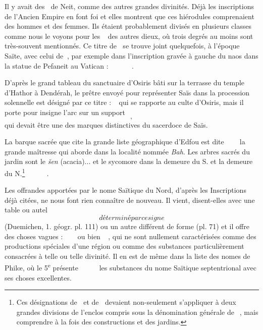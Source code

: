 \documentclass[letterpaper,twocolumn,openany,nodeprecatedcode]{dndbook}
\newcommand*\hieroAAAH{}
\newcommand*\hieroAAAO{}
\newcommand*\hieroAAAQ{}
\newcommand*\hieroAAAX{}
\newcommand*\hieroAABM{}
\newcommand*\hieroAABY{\raisebox{0.5ex}{}}
\newcommand*\hieroAADL{}
\newcommand*\hieroAADT{}
\newcommand*\hieroAADV{\raisebox{0.5ex}{}}
\newcommand*\hieroAAEB{}
\newcommand*\hieroAAEF{}
\newcommand*\hieroAAEK{}
\newcommand*\hieroAAEZ{}
\newcommand*\hieroAAFB{}
\newcommand*\hieroAAFH{}
\newcommand*\hieroAAFK{\raisebox{0.3ex}{}}
\newcommand*\hieroAAFL{}
\newcommand*\hieroAAFM{}
\newcommand*\hieroAAFN{\raisebox{0.5ex}{}}
\newcommand*\hieroAAFQ{}
\newcommand*\hieroAAFS{}
\newcommand*\hieroAAHA{}
\newcommand*\hieroAAHC{}
\newcommand*\hieroAAIK{}
\newcommand*\hieroAAJN{}
\newcommand*\hieroAAMP{}
\newcommand*\hieroAANA{}
\newcommand*\hieroAANP{}
\newcommand*\hieroAAOR{}
\newcommand*\hieroAAQJ{}
\newcommand*\hieroAAQK{}
\newcommand*\hieroAAQL{}
\newcommand*\hieroAAQM{}
\newcommand*\hieroAAQN{}
\newcommand*\hieroAAQO{}
\newcommand*\hieroAAQP{}
\newcommand*\hieroAAQQ{}
\newcommand*\hieroAAQR{}
\newcommand*\hieroAAQS{}
\newcommand*\hieroAAQT{}
\newcommand*\hieroAAQU{}
\newcommand*\hieroAAQV{}
\newcommand*\hieroAAQW{}
\newcommand*\hieroAAQX{}
\newcommand*\hieroAAQY{}
\newcommand*\hieroAAQZ{}
\newcommand*\hieroAARA{}
\newcommand*\hieroAARB{}
\newcommand*\hieroAARC{\raisebox{0.5ex}{}}
\newcommand*\hieroAARD{}
\newcommand*\hieroAARE{}
\newcommand*\hieroAARF{}
\newcommand*\hieroAARG{}
\newcommand*\hieroAARH{}
\newcommand*\hieroAARI{}
\newcommand*\hieroAARJ{}
\newcommand*\hieroAARK{\raisebox{0.5ex}{}}
\newcommand*\hieroAARL{}
\begin{document}
Il y avait des $\hieroAAEK\:\hieroAAHC$ de Neit, comme des autres grandes divinités. Déjà les inscriptions de l'Ancien Empire en font foi et elles montrent que ces hiérodules comprenaient des hommes et des femmes. Ils étaient probablement divisés en plusieurs classes comme nous le voyons pour les $\hieroAAEK\:\hieroAAHC\:\hieroAAEF$ des autres dieux, où trois degrés au moins sont très-souvent mentionnés. Ce titre de $\hieroAAEK\:\hieroAAHC$ se trouve joint quelquefois, à l'époque Saïte, avec celui de $\hieroAAOR\:\hieroAAHA$, par exemple dans l'inscription gravée à gauche du naos dans la statue de Pefaneit au Vatican : $\hieroAAOR\:\hieroAAHA\:\hieroAAEK\allowbreak\:\hieroAAHC\:\hieroAAAQ\:\hieroAAAO\allowbreak\:\hieroAAAH\:\hieroAANA
\:\hieroAADL\:\hieroAAFN\allowbreak\:\hieroAAQJ\:\hieroAAFK\allowbreak\:\hieroAAAQ\:\hieroAAAO$.

D'après le grand tableau du sanctuaire d'Osiris bâti sur la terrasse du temple d'Hathor à Dendérah, le prêtre envoyé pour représenter Saïs dans la procession solennelle est désigné par ce titre : $\hieroAAJN\:\hieroAAQK\:\hieroAAEB$ qui se rapporte au culte d'Osiris, mais il porte pour insigne l'arc sur un support $\hieroAAQL$, $\hieroAAQM$ qui devait être une des marques distinctives du sacerdoce de Saïs.

La barque sacrée que cite la grande liste géographique d'Edfou est dite $\hieroAAFS\:\hieroAAFQ\:\hieroAAQN\allowbreak\:\hieroAAFH\:\hieroAABM\:\hieroAANP\allowbreak\:\hieroAAFL\:\hieroAAFM$ la grande maîtresse qui aborde dans la localité nommée \emph{Bah}. Les arbres sacrés du jardin sont le \emph{šen} (acacia)... et le sycomore dans la demeure du S. et la demeure du N.\footnote{Ces désignations de $\hieroAAQS\:\hieroAAQT$ et de $\hieroAAQU\:\hieroAAQT$ devaient non-seulement s'appliquer à deux grandes divisions de l'enclos compris sous la dénomination générale de $\hieroAAHA\:\hieroAAAQ\:\hieroAAAO$, mais comprendre à la fois des constructions et des jardins.} $\hieroAAQO\:\hieroAAQP\:\hieroAAQQ\allowbreak\:\hieroAAAH\:\hieroAAEK\:\hieroAAQP\allowbreak\:\hieroAAQR\:\hieroAAQP\:\hieroAADV\allowbreak\:\hieroAAQS\:\hieroAAQT\allowbreak\:\hieroAAQU\:\hieroAAQV$.

Les offrandes apportées par le nome Saïtique du Nord, d'après les Inscriptions déjà citées, ne nous font rien connaître de nouveau. Il vient, disent-elles avec une table ou autel $\hieroAAQW$ déterminé par ce signe $\hieroAAQX$ (Duemichen, 1. géogr. pl. 111) ou un autre différent de forme (pl. 71) et il offre des choses vagues : $\hieroAAQY\:\hieroAAQZ\:\hieroAAMP\allowbreak\:\hieroAADV\:\hieroAAAX\allowbreak\:\hieroAAIK\:\hieroAARA$ ou bien $\hieroAARB\:\hieroAARC\allowbreak\:\hieroAARD\:\hieroAARE$, qui ne sont nullement caractérisées comme des productions spéciales d'une région ou comme des substances particulièrement consacrées à telle ou telle divinité. Il en est de même dans la liste des nomes de Philœ, où le 5\textsuperscript{e} présente $\hieroAAEZ\:\hieroAARF\:\hieroAADT\allowbreak\:\hieroAARG\:\hieroAARH\:\hieroAARI\allowbreak\:\hieroAARJ\:\hieroAABY\:\hieroAARK\allowbreak\:\hieroAAFB\:\hieroAARL$ les substances du nome Saïtique septentrional avec ses choses excellentes.
\end{document}
